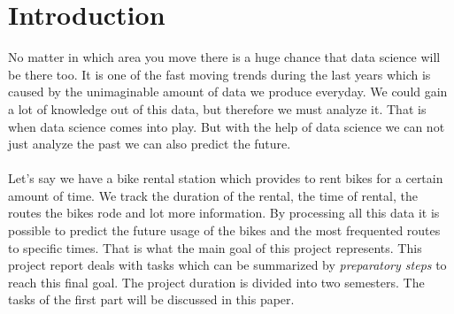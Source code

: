 
\section{Introduction}
No matter in which area you move there is a huge chance that data science will be there too. It is one of the fast moving trends during the last years which is caused by the unimaginable amount of data we produce everyday. We could gain a lot of knowledge out of this data, but therefore we must analyze it. That is when data science comes into play. But with the help of data science we can not just analyze the past we can also predict the future.\\\\
Let's say we have a bike rental station which provides to rent bikes for a certain amount of time. We track the duration of the rental, the time of rental, the routes the bikes rode and lot more information. By processing all this data it is possible to predict the future usage of the bikes and the most frequented routes to specific times.
That is what the main goal of this project represents. This project report deals with tasks which can be summarized by \emph{preparatory steps} to reach this final goal. The project duration is divided into two semesters. The tasks of the first part will be discussed in this paper.

